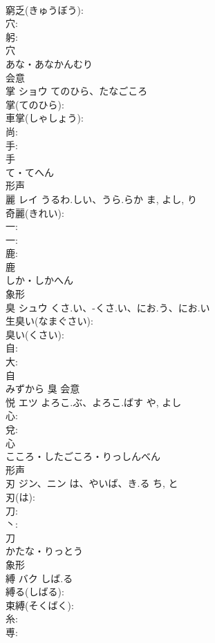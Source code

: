 \documentclass[8pt]{extreport}
\begin{document}
\begin{CJK}{UTF8}{min}
\\	窮乏(きゅうぼう): 
\\	穴: 
\\	躬: 
\\	穴	
\\	あな・あなかんむり	
\\	会意 
\\	掌	ショウ	てのひら、たなごころ		
\\	掌(てのひら): 
\\	車掌(しゃしょう): 
\\	尚: 
\\	手: 
\\	手	
\\	て・てへん	
\\	形声 
\\	麗	レイ	うるわ.しい、うら.らか	ま, よし, り	
\\	奇麗(きれい): 
\\	一: 
\\	一: 
\\	鹿: 
\\	鹿	
\\	しか・しかへん	
\\	象形 
\\	臭	シュウ	くさ.い、-くさ.い、にお.う、にお.い		
\\	生臭い(なまぐさい): 
\\	臭い(くさい): 
\\	自: 
\\	大: 
\\	自	
\\	みずから	臭	会意 
\\	悦	エツ	よろこ.ぶ、よろこ.ばす	や, よし	
\\	心: 
\\	兌: 
\\	心	
\\	こころ・したごころ・りっしんべん	
\\	形声 
\\	刃	ジン、ニン	は、やいば、き.る	ち, と	
\\	刃(は): 
\\	刀: 
\\	丶: 
\\	刀	
\\	かたな・りっとう	
\\	象形 
\\	縛	バク	しば.る		
\\	縛る(しばる): 
\\	束縛(そくばく): 
\\	糸: 
\\	尃: 

\end{CJK}
\end{document}
